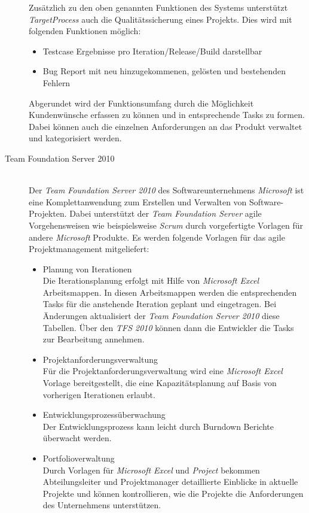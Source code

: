 \begin{description}
Zusätzlich zu den oben genannten Funktionen des Systems unterstützt \emph{TargetProcess} auch die Qualitätssicherung eines Projekts. Dies wird mit folgenden Funktionen möglich:
\begin{itemize}
\item Testcase Ergebnisse pro Iteration/Release/Build darstellbar
\item Bug Report mit neu hinzugekommenen, gelösten und bestehenden Fehlern
\end{itemize}

Abgerundet wird der Funktionsumfang durch die Möglichkeit Kundenwünsche erfassen zu können und in entsprechende Tasks zu formen. Dabei können auch die einzelnen Anforderungen an das Produkt verwaltet und kategorisiert werden. \cite{bib:targetprocess} \\

\item[Team Foundation Server 2010]\hspace*{1em}\\
Der \emph{Team Foundation Server 2010} des Softwareunternehmens \emph{Microsoft} ist eine Komplettanwendung zum Erstellen und Verwalten von Software-Projekten. Dabei unterstützt der \emph{Team Foundation Server} agile Vorgehensweisen wie beispielsweise \emph{Scrum} durch vorgefertigte Vorlagen für andere \emph{Microsoft} Produkte. Es werden folgende Vorlagen für das agile Projektmanagement mitgeliefert:
\begin{itemize}
\item Planung von Iterationen\\
Die Iterationsplanung erfolgt mit Hilfe von \emph{Microsoft Excel} Arbeitsmappen. In diesen Arbeitsmappen werden die entsprechenden Tasks für die anstehende Iteration geplant und eingetragen. Bei Änderungen aktualisiert der \emph{Team Foundation Server 2010} diese Tabellen. Über den \emph{TFS 2010} können dann die Entwickler die Tasks zur Bearbeitung annehmen.

\item Projektanforderungsverwaltung\\
Für die Projektanforderungsverwaltung wird eine \emph{Microsoft Excel} Vorlage bereitgestellt, die eine Kapazitätsplanung auf Basis von vorherigen Iterationen erlaubt.

\item Entwicklungsprozessüberwachung\\
Der Entwicklungsprozess kann leicht durch Burndown Berichte überwacht werden.

\item Portfolioverwaltung\\
Durch Vorlagen für \emph{Microsoft Excel} und \emph{Project} bekommen Abteilungsleiter und Projektmanager detaillierte Einblicke in aktuelle Projekte und können kontrollieren, wie die Projekte die Anforderungen des Unternehmens unterstützen.


\end{itemize}
\end{description}
